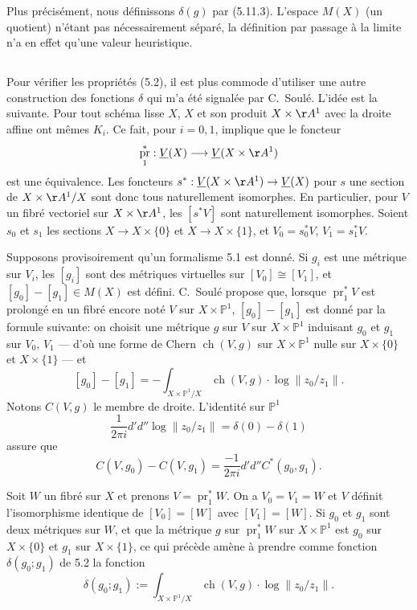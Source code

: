 \documentclass[12pt,a4paper]{article}
\theoremstyle{plain}
\theoremstyle{definition}
\DeclareMathOperator{\ch}{ch}
\DeclareMathOperator{\pr}{pr}
\newcommand{\PP}{\mathbb{P}}
\begin{document}
Plus pr\'ecis\'ement, nous d\'efinissons $\delta(g)$ par (5.11.3). L'espace $M(X)$
(un quotient) n'\'etant pas n\'ecessairement s\'epar\'e, la d\'efinition par passage \`a la
limite n'a en effet qu'une valeur heuristique.

\subsection{}

Pour v\'erifier les propri\'et\'es (5.2), il est plus commode d'utiliser une autre
construction des fonctions $\delta$ qui m'a \'et\'e signal\'ee par C.~Soul\'e. L'id\'ee est
la suivante. Pour tout sch\'ema lisse $X$, $X$ et son produit $X \times \AA^1$ avec la droite
affine ont m\^emes $K_i$. Ce fait, pour $i = 0, 1$, implique que le foncteur
\[
\pr_1^*: \underline{V}(X) \longrightarrow \underline{V}(X \times \AA^1)
\]
est une \'equivalence. Les foncteurs $s^*: \underline{V}(X \times \AA^1) \to \underline{V}(X)$ pour $s$ une section
de $X \times \AA^1/X$ sont donc tous naturellement isomorphes. En particulier, pour
$V$ un fibr\'e vectoriel sur $X \times \AA^1$, les $[s^* V]$ sont naturellement isomorphes.
Soient $s_0$ et $s_1$ les sections $X \to X \times \{0\}$ et $X \to X \times \{1\}$, et $V_0 = s_0^* V$,
$V_1 = s_1^* V$.

Supposons provisoirement qu'un formalisme 5.1 est donn\'e. Si $g_i$ est une
m\'etrique sur $V_i$, les $[g_i]$ sont des m\'etriques virtuelles sur $[V_0] \cong [V_1]$,
et $[g_0] - [g_1] \in M(X)$ est d\'efini. C.~Soul\'e propose que, lorsque $\pr_1^* V$ est prolong\'e
en un fibr\'e encore not\'e $V$ sur $X \times \PP^1$, $[g_0] - [g_1]$ est donn\'e par la formule
suivante: on choisit une m\'etrique $g$ sur $V$ sur $X \times \PP^1$ induisant $g_0$ et
$g_1$ sur $V_0$, $V_1$ --- d'o\`u une forme de Chern $\ch(V, g)$ sur $X \times \PP^1$ nulle sur
$X \times \{0\}$ et $X \times \{1\}$ --- et
\begin{equation}\label{eq:5.12.1}
[g_0] - [g_1] = -\int_{X \times \PP^1/X} \ch(V, g) \cdot \log\|z_0/z_1\| .
\end{equation}
Notons $C(V, g)$ le membre de droite. L'identit\'e sur $\PP^1$
\[
\frac{1}{2\pi i} d'd'' \log\|z_0/z_1\| = \delta(0) - \delta(1)
\]
assure que
\begin{equation}\label{eq:5.12.2}
C(V, g_0) - C(V, g_1) = \frac{-1}{2\pi i} d'd'' C^*(g_0, g_1) .
\end{equation}

Soit $W$ un fibr\'e sur $X$ et prenons $V = \pr_1^* W$. On a $V_0 = V_1 = W$ et
$V$ d\'efinit l'isomorphisme identique de $[V_0] = [W]$ avec $[V_1] = [W]$. Si $g_0$
et $g_1$ sont deux m\'etriques sur $W$, et que la m\'etrique $g$ sur $\pr_1^* W$ sur $X \times \PP^1$
est $g_0$ sur $X \times \{0\}$ et $g_1$ sur $X \times \{1\}$, ce qui pr\'ec\`ede am\`ene \`a prendre comme fonction $\delta(g_0; g_1)$ de 5.2 la fonction
\begin{equation}\label{eq:5.12.3}
\delta(g_0; g_1) := \int_{X \times \PP^1/X} \ch(V, g) \cdot \log\|z_0/z_1\| .
\end{equation}
\end{document}

